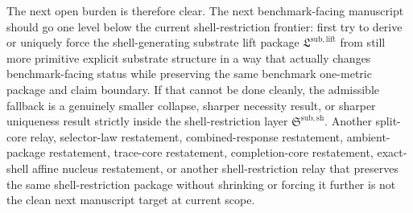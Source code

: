 \documentclass[11pt]{article}
\newcommand{\ShellRestriction}{\mathfrak S^{\mathrm{sub,sh}}}
\newcommand{\LiftPackage}{\mathfrak L^{\mathrm{sub,lift}}}
\begin{document}
The next open burden is therefore clear. The next benchmark-facing manuscript should go one level below the current shell-restriction frontier: first try to derive or uniquely force the shell-generating substrate lift package \(\LiftPackage\) from still more primitive explicit substrate structure in a way that actually changes benchmark-facing status while preserving the same benchmark one-metric package and claim boundary. If that cannot be done cleanly, the admissible fallback is a genuinely smaller collapse, sharper necessity result, or sharper uniqueness result strictly inside the shell-restriction layer \(\ShellRestriction\). Another split-core relay, selector-law restatement, combined-response restatement, ambient-package restatement, trace-core restatement, completion-core restatement, exact-shell affine nucleus restatement, or another shell-restriction relay that preserves the same shell-restriction package without shrinking or forcing it further is not the clean next manuscript target at current scope.
\end{document}
